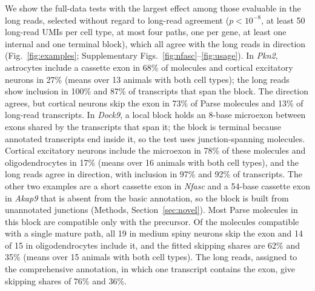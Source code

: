 \documentclass[11pt]{article}
\begin{document}
We show the full-data tests with the largest effect among those evaluable in the long reads, selected without regard to long-read agreement ($p<10^{-8}$, at least 50 long-read UMIs per cell type, at most four paths, one per gene, at least one internal and one terminal block), which all agree with the long reads in direction (Fig.~\ref{fig:examples}; Supplementary Figs.~\ref{fig:nfasc}--\ref{fig:usage}). In \emph{Pkn2}, astrocytes include a cassette exon in 68\% of molecules and cortical excitatory neurons in 27\% (means over 13 animals with both cell types); the long reads show inclusion in 100\% and 87\% of transcripts that span the block. The direction agrees, but cortical neurons skip the exon in 73\% of Parse molecules and 13\% of long-read transcripts. In \emph{Dock9}, a local block holds an 8-base microexon between exons shared by the transcripts that span it; the block is terminal because annotated transcripts end inside it, so the test uses junction-spanning molecules. Cortical excitatory neurons include the microexon in 78\% of these molecules and oligodendrocytes in 17\% (means over 16 animals with both cell types), and the long reads agree in direction, with inclusion in 97\% and 92\% of transcripts. The other two examples are a short cassette exon in \emph{Nfasc} and a 54-base cassette exon in \emph{Akap9} that is absent from the basic annotation, so the block is built from unannotated junctions (Methods, Section~\ref{sec:novel}). Most Parse molecules in this block are compatible only with the precursor. Of the molecules compatible with a single mature path, all 19 in medium spiny neurons skip the exon and 14 of 15 in oligodendrocytes include it, and the fitted skipping shares are 62\% and 35\% (means over 15 animals with both cell types). The long reads, assigned to the comprehensive annotation, in which one transcript contains the exon, give skipping shares of 76\% and 36\%.
\end{document}
